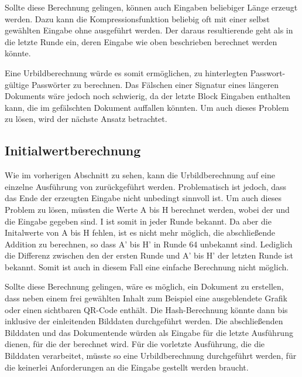 Sollte diese Berechnung gelingen, können auch Eingaben beliebiger Länge erzeugt werden. Dazu kann die Kompressionsfunktion beliebig oft mit einer selbst gewählten Eingabe
ohne  ausgeführt werden. Der daraus resultierende  geht als  in die letzte Runde ein, deren Eingabe wie oben beschrieben berechnet werden könnte.

Eine Urbildberechnung würde es somit ermöglichen, zu hinterlegten Passwort- gültige Passwörter zu berechnen. Das Fälschen einer Signatur eines längeren Dokuments
wäre jedoch noch schwierig, da der letzte Block Eingaben enthalten kann, die im gefälschten Dokument auffallen könnten. Um auch dieses Problem zu lösen, wird der nächste
Ansatz betrachtet.

\subsection{Initialwertberechnung}
\label{sec:initialwertberechnung}
Wie im vorherigen Abschnitt zu sehen, kann die Urbildberechnung auf eine einzelne Ausführung von  zurückgeführt werden.
Problematisch ist jedoch, dass das Ende der erzeugten Eingabe nicht unbedingt sinnvoll ist. Um auch dieses Problem zu lösen, müssten
die Werte A bis H berechnet werden, wobei der  und die Eingabe gegeben sind. I ist somit in jeder Runde bekannt. Da aber die Initalwerte
von A bis H fehlen, ist es nicht mehr möglich, die abschließende Addition zu berechnen, so dass A' bis H' in Runde 64 unbekannt sind. Lediglich
die Differenz zwischen den  der ersten Runde und A' bis H' der letzten Runde ist bekannt. Somit ist auch in diesem Fall eine
einfache Berechnung nicht möglich.

Sollte diese Berechnung gelingen, wäre es möglich, ein Dokument zu erstellen, dass neben einem frei gewählten Inhalt zum Beispiel eine ausgeblendete
Grafik oder einen sichtbaren QR-Code enthält. Die Hash-Berechnung könnte dann bis inklusive der einleitenden Bilddaten durchgeführt werden.
Die abschließenden Bilddaten und das Dokumentende würden als Eingabe für die letzte Ausführung dienen, für die der  berechnet wird.
Für die vorletzte Ausführung, die die Bilddaten verarbeitet, müsste so eine Urbildberechnung durchgeführt werden, für die keinerlei Anforderungen
an die Eingabe gestellt werden braucht.

